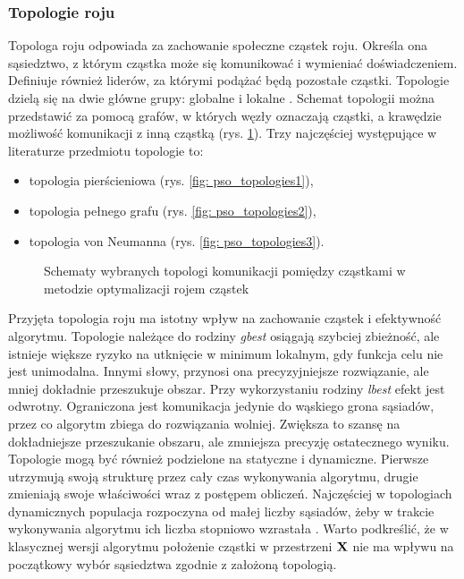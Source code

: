\subsubsection{Topologie roju}
Topologa roju odpowiada za zachowanie społeczne cząstek roju.  Określa ona sąsiedztwo, z którym cząstka może się komunikować i wymieniać doświadczeniem. Definiuje również liderów, za którymi podążać będą pozostałe cząstki. Topologie dzielą się na dwie główne grupy: globalne  i lokalne . Schemat topologii można przedstawić za pomocą grafów, w których węzły oznaczają cząstki, a krawędzie możliwość komunikacji z inną cząstką (rys. \ref{fig: pso_topologies}). Trzy najczęściej występujące w literaturze przedmiotu topologie to:
\begin{itemize}
	\item topologia pierścieniowa (rys. \ref{fig: pso_topologies1}),
	\item topologia pełnego grafu (rys. \ref{fig: pso_topologies2}),
	\item topologia von Neumanna (rys. \ref{fig: pso_topologies3}).
\end{itemize}
\begin{figure}[hbt!]
	\centering
	\captionsetup{justification=centering}
	\caption{Schematy wybranych topologi komunikacji pomiędzy cząstkami w metodzie optymalizacji rojem cząstek}
	\label{fig: pso_topologies}
\end{figure}
Przyjęta topologia roju ma istotny wpływ na zachowanie cząstek i efektywność algorytmu. Topologie należące do rodziny \textit{gbest} osiągają szybciej zbieżność, ale istnieje większe ryzyko na utknięcie w minimum lokalnym, gdy funkcja celu nie jest unimodalna. Innymi słowy, przynosi ona precyzyjniejsze rozwiązanie, ale mniej dokładnie przeszukuje obszar. Przy wykorzystaniu rodziny \textit{lbest} efekt jest odwrotny. Ograniczona jest komunikacja jedynie do wąskiego grona sąsiadów, przez co algorytm zbiega do rozwiązania wolniej. Zwiększa to szansę na dokładniejsze przeszukanie obszaru, ale zmniejsza precyzję ostatecznego wyniku. Topologie mogą być również podzielone na statyczne i dynamiczne. Pierwsze utrzymują swoją strukturę przez cały czas wykonywania algorytmu, drugie zmieniają swoje właściwości wraz z postępem obliczeń. Najczęściej w topologiach dynamicznych populacja rozpoczyna od małej liczby sąsiadów, żeby w trakcie wykonywania algorytmu ich liczba stopniowo wzrastała \parencite{Poli2007}. Warto podkreślić, że w klasycznej wersji algorytmu położenie cząstki w przestrzeni $\mathbf{X}$ nie ma wpływu na początkowy wybór sąsiedztwa zgodnie z założoną topologią.

